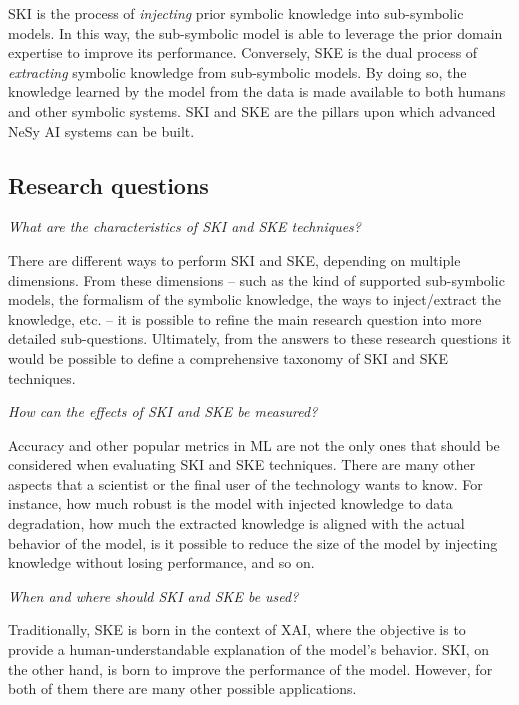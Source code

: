 \begin{refsection}
\Ac{SKI} is the process of \emph{injecting} prior symbolic knowledge into sub-symbolic models.
%
In this way, the sub-symbolic model is able to leverage the prior domain expertise to improve its performance.
%
Conversely, \ac{SKE} is the dual process of \emph{extracting} symbolic knowledge from sub-symbolic models.
%
By doing so, the knowledge learned by the model from the data is made available to both humans and other symbolic systems.
%
\Ac{SKI} and \ac{SKE} are the pillars upon which advanced \ac{NeSy} \ac{AI} systems can be built.


\subsection*{Research questions}
%
\begin{questions}
    \item \emph{What are the characteristics of \ac{SKI} and \ac{SKE} techniques?}

    There are different ways to perform \ac{SKI} and \ac{SKE}, depending on multiple dimensions.
    From these dimensions -- such as the kind of supported sub-symbolic models, the formalism of the symbolic knowledge, the ways to inject/extract the knowledge, etc. -- it is possible to refine the main research question into more detailed sub-questions.
    Ultimately, from the answers to these research questions it would be possible to define a comprehensive taxonomy of \ac{SKI} and \ac{SKE} techniques.
    \label{itm:rq1}

    \item \emph{How can the effects of \ac{SKI} and \ac{SKE} be measured?}

    Accuracy and other popular metrics in \ac{ML} are not the only ones that should be considered when evaluating \ac{SKI} and \ac{SKE} techniques.
    There are many other aspects that a scientist or the final user of the technology wants to know.
    For instance,
    how much robust is the model with injected knowledge to data degradation,
    how much the extracted knowledge is aligned with the actual behavior of the model,
    is it possible to reduce the size of the model by injecting knowledge without losing performance, and so on.
    \label{itm:rq2}

    \item \emph{When and where should \ac{SKI} and \ac{SKE} be used?}

    Traditionally, \ac{SKE} is born in the context of \ac{XAI}, where the objective is to provide a human-understandable explanation of the model's behavior.
    \Ac{SKI}, on the other hand, is born to improve the performance of the model.
    However, for both of them there are many other possible applications.
    \label{itm:rq3}


\end{questions}
\end{refsection}
